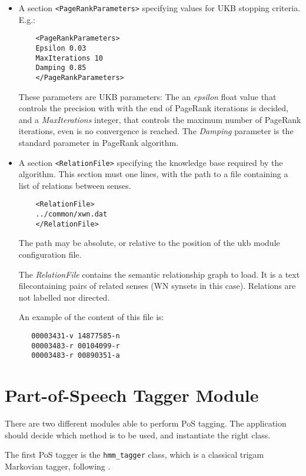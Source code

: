 \documentclass[a4paper]{book}
\begin{document}
\begin{itemize}

  \item A section \verb#<PageRankParameters># specifying values for UKB 
      stopping criteria. E.g.:
\begin{verbatim}
    <PageRankParameters>
    Epsilon 0.03
    MaxIterations 10 
    Damping 0.85
    </PageRankParameters>
\end{verbatim}
    These parameters are UKB parameters: The an {\sl
    epsilon} float value that controls the precision with with the end
    of PageRank iterations is decided, and a {\sl MaxIterations}
    integer, that controls the maximum number of PageRank iterations,
    even is no convergence is reached. The {\sl Damping} parameter is 
    the standard parameter in PageRank algorithm.

 \item A section \verb#<RelationFile># specifying
  the knowledge base required by the algorithm.
  This section must one lines, with the path to a 
  file containing a list of relations between senses.
  \begin{verbatim}
    <RelationFile>
    ../common/xwn.dat
    </RelationFile>
  \end{verbatim}
  The path may be absolute, or relative to the position of the 
  ukb module configuration file.

 The {\sl RelationFile} contains the semantic relationship graph to
 load. It is a text filecontaining pairs of related senses (WN synsets
 in this case). Relations are not labelled nor directed.
 
 An example of the content of this file is:
 \begin{verbatim}
   00003431-v 14877585-n
   00003483-r 00104099-r
   00003483-r 00890351-a
 \end{verbatim}

\end{itemize}

\section{Part-of-Speech Tagger Module}
\label{sec-pos}

  There are two different modules able to perform PoS tagging. The
  application should decide which method is to be used, and
  instantiate the right class.

  The first PoS tagger is the {\tt hmm\_tagger} class, which is a
  classical trigam Markovian tagger, following \cite{brants00}.
\end{document}
